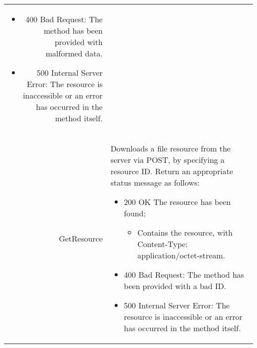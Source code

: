 \begin{longtable}{r p{10cm}}
\begin{itemize}
		\item 400 Bad Request: The method has been provided with malformed data.
		\item 500 Internal Server Error: The resource is inaccessible or an error has occurred in the method itself.
	\end{itemize}\\
	GetResource & Downloads a file resource from the server via POST, by specifying a resource ID. Return an appropriate status message as follows:
	\begin{itemize}
		\item 200 OK The resource has been found; 
		\begin{itemize}
			\item Contains the resource, with Content-Type: application/octet-stream.
		\end{itemize}
		\item 400 Bad Request: The method has been provided with a bad ID.
		\item 500 Internal Server Error: The resource is inaccessible or an error has occurred in the method itself.
	\end{itemize}\\
	\end{longtable}